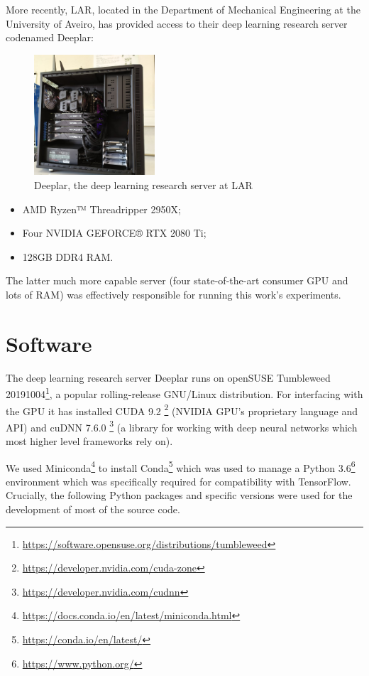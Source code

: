 More recently, \ac{LAR}, located in the Department of Mechanical Engineering at the University of Aveiro, has provided access to their deep learning research server codenamed Deeplar:

\begin{figure}[ht]
    \centering
    \includegraphics[width=0.4\textwidth]{figs/deeplar.jpg}
    \caption{Deeplar, the deep learning research server at \ac{LAR}}
    \label{fig:deeplar}
\end{figure}

\begin{itemize}
    \item AMD Ryzen™ Threadripper 2950X;
    \item Four NVIDIA GEFORCE® RTX 2080 Ti;
    \item 128GB DDR4 RAM.
\end{itemize}

The latter much more capable server (four state-of-the-art consumer \ac{GPU} and lots of \ac{RAM}) was effectively responsible for running this work's experiments.

\section{Software}

The deep learning research server Deeplar runs on openSUSE Tumbleweed 20191004\footnote{\url{https://software.opensuse.org/distributions/tumbleweed}}, a popular rolling-release GNU/Linux distribution. For interfacing with the \ac{GPU} it has installed CUDA 9.2 \footnote{\url{https://developer.nvidia.com/cuda-zone}} (NVIDIA GPU's proprietary language and API) and cuDNN 7.6.0 \footnote{\url{https://developer.nvidia.com/cudnn}} (a library for working with deep neural networks which most higher level frameworks rely on).

We used Miniconda\footnote{\url{https://docs.conda.io/en/latest/miniconda.html}} to install Conda\footnote{\url{https://conda.io/en/latest/}} which was used to manage a Python 3.6\footnote{\url{https://www.python.org/}} environment which was specifically required for compatibility with TensorFlow. Crucially, the following Python packages and specific versions were used for the development of most of the source code.

